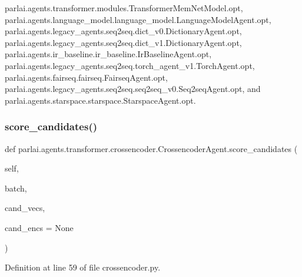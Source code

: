 parlai.\+agents.\+transformer.\+modules.\+Transformer\+Mem\+Net\+Model.\+opt, parlai.\+agents.\+language\+\_\+model.\+language\+\_\+model.\+Language\+Model\+Agent.\+opt, parlai.\+agents.\+legacy\+\_\+agents.\+seq2seq.\+dict\+\_\+v0.\+Dictionary\+Agent.\+opt, parlai.\+agents.\+legacy\+\_\+agents.\+seq2seq.\+dict\+\_\+v1.\+Dictionary\+Agent.\+opt, parlai.\+agents.\+ir\+\_\+baseline.\+ir\+\_\+baseline.\+Ir\+Baseline\+Agent.\+opt, parlai.\+agents.\+legacy\+\_\+agents.\+seq2seq.\+torch\+\_\+agent\+\_\+v1.\+Torch\+Agent.\+opt, parlai.\+agents.\+fairseq.\+fairseq.\+Fairseq\+Agent.\+opt, parlai.\+agents.\+legacy\+\_\+agents.\+seq2seq.\+seq2seq\+\_\+v0.\+Seq2seq\+Agent.\+opt, and parlai.\+agents.\+starspace.\+starspace.\+Starspace\+Agent.\+opt.

\mbox{\label{classparlai_1_1agents_1_1transformer_1_1crossencoder_1_1CrossencoderAgent_a5c286ce0bc163e443e73182f95d6e0c6}} 
\subsubsection{\texorpdfstring{score\+\_\+candidates()}{score\_candidates()}}
{\footnotesize\ttfamily def parlai.\+agents.\+transformer.\+crossencoder.\+Crossencoder\+Agent.\+score\+\_\+candidates (\begin{DoxyParamCaption}\item[{}]{self,  }\item[{}]{batch,  }\item[{}]{cand\+\_\+vecs,  }\item[{}]{cand\+\_\+encs = {\ttfamily None} }\end{DoxyParamCaption})}



Definition at line 59 of file crossencoder.\+py.



